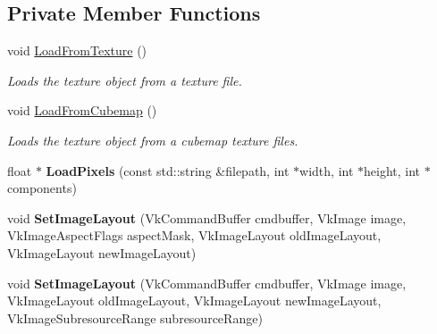 \subsection*{Private Member Functions}
\begin{DoxyCompactItemize}
\item 
void \hyperlink{class_flounder_1_1_texture_a161cd9374983933816a8c5732bddaeb7}{Load\+From\+Texture} ()
\begin{DoxyCompactList}\small\item\em Loads the texture object from a texture file. \end{DoxyCompactList}\item 
void \hyperlink{class_flounder_1_1_texture_afd7e9dad57e98b5059c29cd9acc83e2c}{Load\+From\+Cubemap} ()
\begin{DoxyCompactList}\small\item\em Loads the texture object from a cubemap texture files. \end{DoxyCompactList}\item 
\mbox{\label{class_flounder_1_1_texture_ab0c54c7d1ae2d76612c66702f12f2856}} 
float $\ast$ {\bfseries Load\+Pixels} (const std\+::string \&filepath, int $\ast$width, int $\ast$height, int $\ast$components)
\item 
\mbox{\label{class_flounder_1_1_texture_a19d46785c80596d89a517ca4b848dbfa}} 
void {\bfseries Set\+Image\+Layout} (Vk\+Command\+Buffer cmdbuffer, Vk\+Image image, Vk\+Image\+Aspect\+Flags aspect\+Mask, Vk\+Image\+Layout old\+Image\+Layout, Vk\+Image\+Layout new\+Image\+Layout)
\item 
\mbox{\label{class_flounder_1_1_texture_aaac2ab54a6ee1406b62280597266aebb}} 
void {\bfseries Set\+Image\+Layout} (Vk\+Command\+Buffer cmdbuffer, Vk\+Image image, Vk\+Image\+Layout old\+Image\+Layout, Vk\+Image\+Layout new\+Image\+Layout, Vk\+Image\+Subresource\+Range subresource\+Range)
\end{DoxyCompactItemize}
